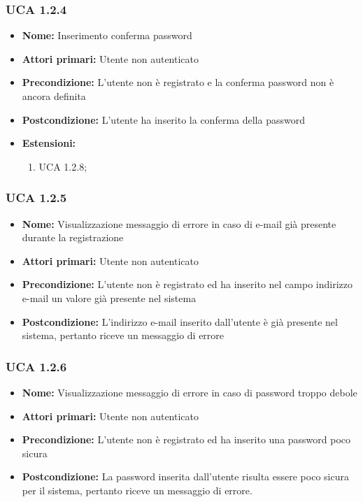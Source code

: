 \subsubsection{UCA 1.2.4}%
\begin{itemize}
\item \textbf{Nome:} Inserimento conferma password
\item \textbf{Attori primari:} Utente non autenticato
\item \textbf{Precondizione:} L’utente non è registrato  e la conferma password non è ancora definita
\item \textbf{Postcondizione:} L’utente ha inserito la conferma della password
\item \textbf{Estensioni:}
	\begin{enumerate}
		\item UCA 1.2.8;
	\end{enumerate}
\end{itemize}

\subsubsection{UCA 1.2.5}%
\begin{itemize}
\item \textbf{Nome:} Visualizzazione messaggio di errore in caso di e-mail già presente durante la registrazione
\item \textbf{Attori primari:} Utente non autenticato
\item \textbf{Precondizione:} L’utente non è registrato ed ha inserito nel campo indirizzo e-mail un valore già presente nel sistema
\item \textbf{Postcondizione:} L'indirizzo e-mail inserito dall'utente è già presente nel sistema, pertanto riceve un messaggio di errore 
\end{itemize}

\subsubsection{UCA 1.2.6}%
\begin{itemize}
\item \textbf{Nome:} Visualizzazione messaggio di errore in caso di password troppo debole 
\item \textbf{Attori primari:} Utente non autenticato
\item \textbf{Precondizione:} L’utente non è registrato ed ha inserito una password poco sicura
\item \textbf{Postcondizione:} La password inserita dall’utente risulta essere poco sicura per il sistema, pertanto riceve un messaggio di errore.
\end{itemize}

